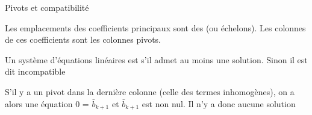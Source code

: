 \begin{parag}{Pivots et compatibilité}
    \begin{definition}
        Les emplacements des coefficients principaux sont des  (ou échelons). Les colonnes de ces coefficients sont les colonnes pivots.
    \end{definition}
    \begin{definition}
        Un système d'équations linéaires est  s'il admet au moins une solution. Sinon il est dit incompatible
    \end{definition}
    S'il y a un pivot dans la dernière colonne (celle des termes inhomogènes), on a alors une équation 0 = $\bar{b}_{k+1}$ et $\bar{b}_{k+1}$ est non nul. Il n'y a donc aucune solution
\end{parag}